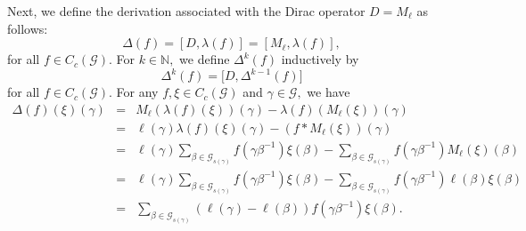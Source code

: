 \documentclass[a4paper,11pt,reqno]{amsart}
\theoremstyle{plain}
\theoremstyle{named}
\numberwithin{equation}{section}
\newcommand{\Bea}{\begin{eqnarray*}}
\newcommand{\Eea}{\end{eqnarray*}}
\begin{document}
			\indent Next, we define the derivation associated with the Dirac operator $D = M_{\ell}$ as follows: 
			$$\Delta (f) = \left [D, \lambda (f) \right ] = \left [M_{\ell}, \lambda (f) \right ],$$ for all $f \in C_c (\mathcal G).$ For $k \in \mathbb N,$ we define $\Delta^k (f)$ inductively by 
			$$\Delta^k (f) = \bigl [D, \Delta^{k-1} (f) \bigr ]$$ 
			for all $f \in C_c (\mathcal G).$ For any $f,\xi\in C_c (\mathcal G)$ and $\gamma \in \mathcal G,$ we have
			\Bea
			\Delta (f) (\xi) (\gamma)  & = &  M_{\ell} (\lambda (f) (\xi)) (\gamma) - \lambda (f) (M_{\ell} (\xi)) (\gamma) \\ & = & \ell (\gamma) \lambda (f) (\xi) (\gamma) - (f \ast M_{\ell} (\xi)) (\gamma) \\  & = &  \ell (\gamma) \sum\limits_{\beta \in \mathcal G_{s(\gamma)}} f \left (\gamma \beta^{-1} \right ) \xi (\beta) - \sum\limits_{\beta \in \mathcal G_{s(\gamma)}} f \left (\gamma \beta^{-1} \right ) M_{\ell} (\xi) (\beta) \\ &  = &  \ell (\gamma) \sum\limits_{\beta \in \mathcal G_{s(\gamma)}} f \left (\gamma \beta^{-1} \right ) \xi (\beta) - \sum\limits_{\beta \in \mathcal G_{s(\gamma)}} f \left (\gamma \beta^{-1} \right ) \ell (\beta) \xi (\beta) \\ & = & \sum\limits_{\beta \in \mathcal G_{s(\gamma)}} \left (\ell (\gamma) - \ell (\beta) \right ) f \left (\gamma \beta^{-1} \right ) \xi (\beta).
			\Eea
		
\end{document}
